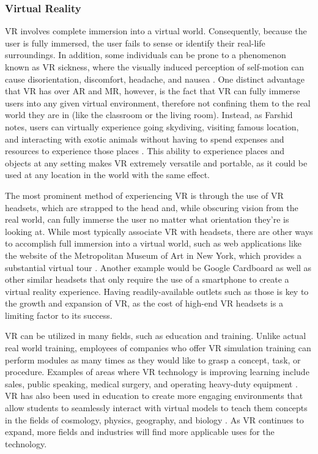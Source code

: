 \documentclass[onecolumn, draftclsnofoot,10pt, compsoc]{IEEEtran}
\begin{document}
\subsubsection{Virtual Reality}
    VR involves complete immersion into a virtual world. Consequently, because the user is fully immersed, the user fails to sense or identify their real-life surroundings. In addition, some individuals can be prone to a phenomenon known as VR sickness, where the visually induced perception of self-motion can cause disorientation, discomfort, headache, and nausea \cite{2}. One distinct advantage that VR has over AR and MR, however, is the fact that VR can fully immerse users into any given virtual environment, therefore not confining them to the real world they are in (like the classroom or the living room). Instead, as Farshid notes, users can virtually experience going skydiving, visiting famous location, and interacting with exotic animals without having to spend expenses and resources to experience those places \cite{2}. This ability to experience places and objects at any setting makes VR extremely versatile and portable, as it could be used at any location in the world with the same effect.

    The most prominent method of experiencing VR is through the use of VR headsets, which are strapped to the head and, while obscuring vision from the real world, can fully immerse the user no matter what orientation they're is looking at. While most typically associate VR with headsets, there are other ways to accomplish full immersion into a virtual world, such as web applications like the website of the Metropolitan Museum of Art in New York, which provides a substantial virtual tour \cite{2}. Another example would be Google Cardboard as well as other similar headsets that only require the use of a smartphone to create a virtual reality experience. Having readily-available outlets such as those is key to the growth and expansion of VR, as the cost of high-end VR headsets is a limiting factor to its success. 

    VR can be utilized in many fields, such as education and training. Unlike actual real world training, employees of companies who offer VR simulation training can perform modules as many times as they would like to grasp a concept, task, or procedure. Examples of areas where VR technology is improving learning include sales, public speaking, medical surgery, and operating heavy-duty equipment \cite{2}. VR has also been used in education to create more engaging environments that allow students to seamlessly interact with virtual models to teach them concepts in the fields of cosmology, physics, geography, and biology \cite{2}. As VR continues to expand, more fields and industries will find more applicable uses for the technology.
 
\end{document}
